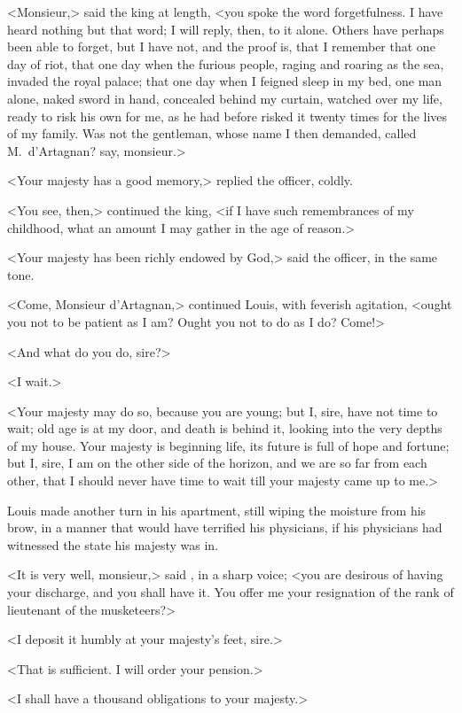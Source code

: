 <Monsieur,> said the king at length, <you spoke the word forgetfulness. I have heard nothing but that word; I will reply, then, to it alone. Others have perhaps been able to forget, but I have not, and the proof is, that I remember that one day of riot, that one day when the furious people, raging and roaring as the sea, invaded the royal palace; that one day when I feigned sleep in my bed, one man alone, naked sword in hand, concealed behind my curtain, watched over my life, ready to risk his own for me, as he had before risked it twenty times for the lives of my family. Was not the gentleman, whose name I then demanded, called M.~d'Artagnan? say, monsieur.>

<Your majesty has a good memory,> replied the officer, coldly.

<You see, then,> continued the king, <if I have such remembrances of my childhood, what an amount I may gather in the age of reason.>

<Your majesty has been richly endowed by God,> said the officer, in the same tone.

<Come, Monsieur d'Artagnan,> continued Louis, with feverish agitation, <ought you not to be patient as I am? Ought you not to do as I do? Come!>

<And what do you do, sire?>

<I wait.>

<Your majesty may do so, because you are young; but I, sire, have not time to wait; old age is at my door, and death is behind it, looking into the very depths of my house. Your majesty is beginning life, its future is full of hope and fortune; but I, sire, I am on the other side of the horizon, and we are so far from each other, that I should never have time to wait till your majesty came up to me.>

Louis made another turn in his apartment, still wiping the moisture from his brow, in a manner that would have terrified his physicians, if his physicians had witnessed the state his majesty was in.

<It is very well, monsieur,> said , in a sharp voice; <you are desirous of having your discharge, and you shall have it. You offer me your resignation of the rank of lieutenant of the musketeers?>

<I deposit it humbly at your majesty's feet, sire.>

<That is sufficient. I will order your pension.>

<I shall have a thousand obligations to your majesty.>

